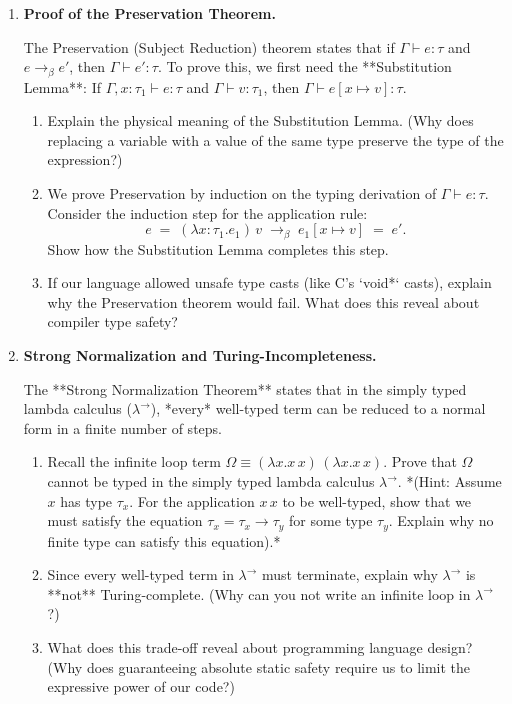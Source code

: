 \documentclass[12pt, a4paper]{book}
\begin{document}
\begin{deepbox}
\begin{enumerate}[label=\textbf{D\arabic*.}]
  \item \textbf{Proof of the Preservation Theorem.}
  
        The Preservation (Subject Reduction) theorem states that if $\Gamma \vdash e : \tau$ and $e \to_\beta e'$, then $\Gamma \vdash e' : \tau$.
        To prove this, we first need the **Substitution Lemma**:
        If $\Gamma, x : \tau_1 \vdash e : \tau$ and $\Gamma \vdash v : \tau_1$, then $\Gamma \vdash e[x \mapsto v] : \tau$.
        
        \begin{enumerate}[label=(\alph*)]
          \item Explain the physical meaning of the Substitution Lemma. (Why does replacing a variable with a value of the same type preserve the type of the expression?)
          \item We prove Preservation by induction on the typing derivation of $\Gamma \vdash e : \tau$.
                Consider the induction step for the application rule:
                \[
                  e \;=\; (\lambda x : \tau_1. e_1) \, v \;\to_\beta\; e_1[x \mapsto v] \;=\; e'.
                \]
                Show how the Substitution Lemma completes this step.
          \item If our language allowed unsafe type casts (like C's `void*` casts), explain why the Preservation theorem would fail. What does this reveal about compiler type safety?
        \end{enumerate}

  \item \textbf{Strong Normalization and Turing-Incompleteness.}
  
        The **Strong Normalization Theorem** states that in the simply typed lambda calculus ($\lambda^\to$), *every* well-typed term can be reduced to a normal form in a finite number of steps.
        
        \begin{enumerate}[label=(\alph*)]
          \item Recall the infinite loop term $\Omega \equiv (\lambda x. x \, x) \, (\lambda x. x \, x)$.
                Prove that $\Omega$ cannot be typed in the simply typed lambda calculus $\lambda^\to$.
                *(Hint: Assume $x$ has type $\tau_x$. For the application $x \, x$ to be well-typed, show that we must satisfy the equation $\tau_x = \tau_x \to \tau_y$ for some type $\tau_y$. Explain why no finite type can satisfy this equation).*
          \item Since every well-typed term in $\lambda^\to$ must terminate, explain why $\lambda^\to$ is **not** Turing-complete. (Why can you not write an infinite loop in $\lambda^\to$?)
          \item What does this trade-off reveal about programming language design? (Why does guaranteeing absolute static safety require us to limit the expressive power of our code?)
        \end{enumerate}
\end{enumerate}
\end{deepbox}
\end{document}
